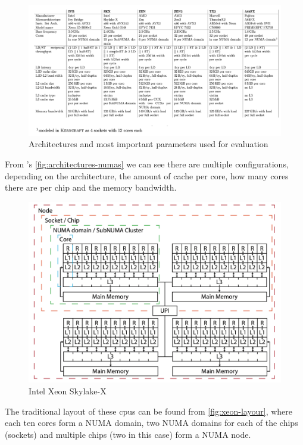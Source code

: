\begin{figure}
    \centering
    \includegraphics[width=0.75\linewidth]{img/table-multi-core-numa.png}
    \caption{Architectures and most important parameters used for evaluation}
    \label{fig:architectures-numas}
\end{figure}

From \cite{zen2-architecture}'s \autoref{fig:architectures-numas} we can see there are multiple configurations, depending on the architecture, the amount of cache per core, how many cores there are per chip and the memory bandwidth.


\begin{figure}
    \centering
    \includegraphics[width=0.75\linewidth]{img/xeon-architecture.png}
    \caption{Intel Xeon Skylake-X}
    \label{fig:xeon-layour}
\end{figure}

The traditional layout of these \glspl{cpu} can be found from \autoref{fig:xeon-layour}, where each ten cores form a \gls{NUMA} domain, two \gls{NUMA} domains for each of the chips (sockets) and multiple chips (two in this case) form a \gls{NUMA} node.


